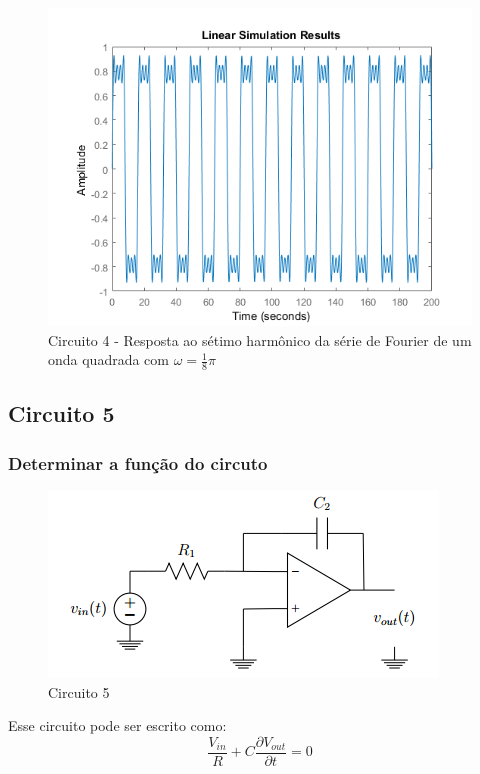 \documentclass[a4paper, 12pt]{article}
\begin{document}
			\begin{figure}[!ht]
				\centering
				\includegraphics[scale=0.71]{img/1m_circ4.png}
				\caption{Circuito 4 - Resposta ao sétimo harmônico da série de Fourier de um onda quadrada com $\omega = \frac{1}{8}\pi$}	
			\end{figure}					
		\clearpage		
		\subsection{Circuito 5}
			\subsubsection{Determinar a função do circuto}
			\begin{figure}[!ht]
				\centering
				\includegraphics{img/circuito5.png}
				\caption{Circuito 5}	
			\end{figure}		
			
			Esse circuito pode ser escrito  como:
			\[
			\frac{V_{in}}{R} + C\frac{\partial V_{out}}{\partial t} = 0
			\] 	\\			
			
\end{document}
